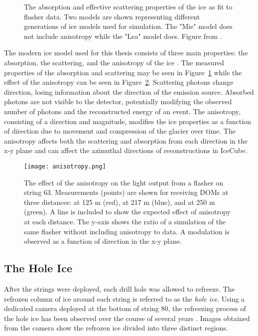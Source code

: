 \begin{figure}[h]
\centering
\caption{The absorption and effective scattering properties of the ice as fit to flasher data. Two models are shown representing different generations of ice models used for simulation. The "Mie" model does not include anisotropy while the "Lea" model does. Figure from \cite{IceCube-SpiceLea}.}
\label{fig:spicelea}
\end{figure}

The modern ice model used for this thesis consists of three main properties: the absorption, the scattering, and the anisotropy of the ice \cite{IceCube-SpiceLea}.
The measured properties of the absorption and scattering may be seen in Figure~\ref{fig:spicelea} while the effect of the anisotropy can be seen in Figure~\ref{fig:anisotropy}.
Scattering photons change direction, losing information about the direction of the emission source.
Absorbed photons are not visible to the detector, potentially modifying the observed number of photons and the reconstructed energy of an event.
The anisotropy, consisting of a direction and magnitude, modifies the ice properties as a function of direction due to movement and compression of the glacier over time.
The anisotropy affects both the scattering and absorption from each direction in the x-y plane and can affect the azimuthal directions of reconstructions in IceCube.

\begin{figure}[h]
\centering
\texttt{[image: anisotropy.png]}
\caption{The effect of the anisotropy on the light output from a flasher on string 63. Measurements (points) are shown for receiving DOMs at three distances: at 125 m (red), at 217 m (blue), and at 250 m (green). A line is included to show the expected effect of anisotropy at each distance. The y-axis shows the ratio of a simulation of the same flasher without including anisotropy to data. A modulation is observed as a function of direction in the x-y plane.}
\label{fig:anisotropy}
\end{figure}


\label{subsec:hole_ice}
\subsection{The Hole Ice}
After the strings were deployed, each drill hole was allowed to refreeze. 
The refrozen column of ice around each string is referred to as the \emph{hole ice}.
Using a dedicated camera deployed at the bottom of string 80, the refreezing process of the hole ice has been observed over the course of several years \cite{IceCube-SwedishCamera, Description-IceCube}.
Images obtained from the camera show the refrozen ice divided into three distinct regions.

